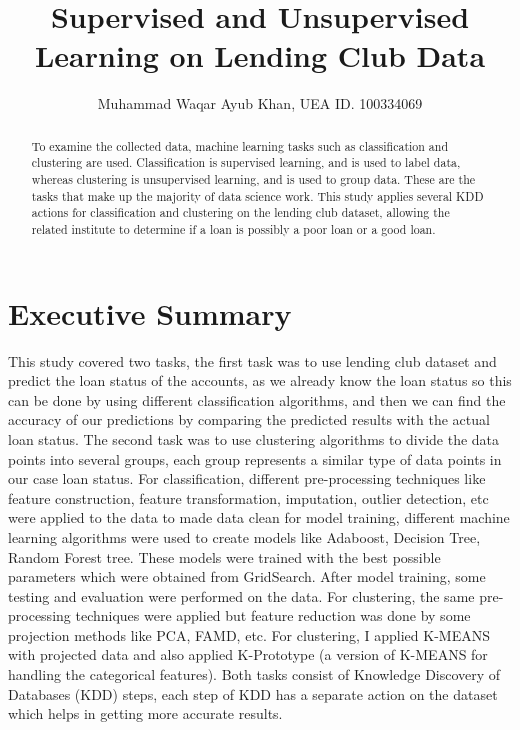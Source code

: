 \documentclass[12pt]{article}
\title{Supervised and Unsupervised Learning on Lending Club Data}
\author{Muhammad Waqar Ayub Khan, UEA ID. 100334069}
\begin{document}
\maketitle

\begin{abstract}
	
\onehalfspacing

To examine the collected data, machine learning tasks such as classification and clustering are used. Classification is supervised learning, and is used to label data, whereas clustering is unsupervised learning, and is used to group data. These are the tasks that make up the majority of data science work. This study applies several KDD actions for classification and clustering on the lending club dataset, allowing the related institute to determine if a loan is possibly a poor loan or a good loan.

\end{abstract}


\section{Executive Summary}
This study covered two tasks, the first task was to use lending club dataset and predict the loan status of the accounts, as we already know the loan status so this can be done by using different classification algorithms, and then we can find the accuracy of our predictions by comparing the predicted results with the actual loan status. The second task was to use clustering algorithms to divide the data points into several groups, each group represents a similar type of data points in our case loan status. For classification, different pre-processing techniques like feature construction, feature transformation, imputation, outlier detection, etc were applied to the data to made data clean for model training, different machine learning algorithms were used to create models like Adaboost, Decision Tree, Random Forest tree. These models were trained with the best possible parameters which were obtained from GridSearch. After model training, some testing and evaluation were performed on the data. For clustering, the same pre-processing techniques were applied but feature reduction was done by some projection methods like PCA, FAMD, etc. For clustering, I applied K-MEANS with projected data and also applied K-Prototype (a version of K-MEANS for handling the categorical features). Both tasks consist of Knowledge Discovery of Databases (KDD) steps, each step of KDD has a separate action on the dataset which helps in getting more accurate results. 
\end{document}
